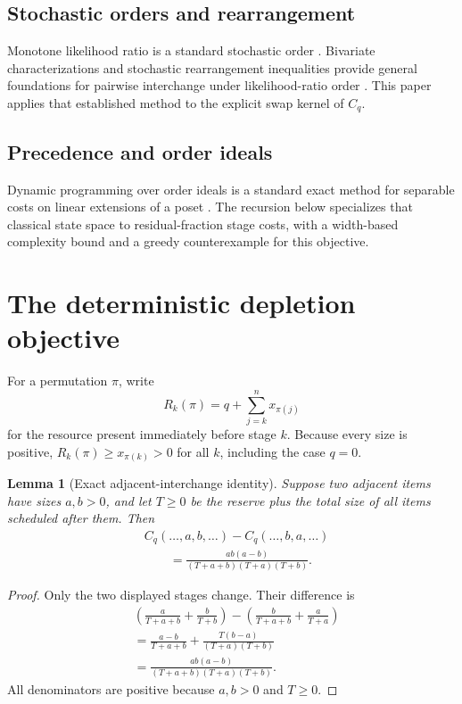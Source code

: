 \documentclass[pdflatex,iicol,sn-basic]{sn-jnl}
\theoremstyle{thmstyleone}
\newtheorem{lemma}[theorem]{Lemma}
\theoremstyle{thmstyletwo}
\theoremstyle{thmstylethree}
\begin{document}
\subsection{Stochastic orders and rearrangement}
Monotone likelihood ratio is a standard stochastic order
\citep{KarlinRubin1956,ShakedShanthikumar2007}. Bivariate characterizations and
stochastic rearrangement inequalities provide general foundations for pairwise
interchange under likelihood-ratio order
\citep{ShanthikumarYao1991,ChangYao1993}. This paper applies that established
method to the explicit swap kernel of \(C_q\).

\subsection{Precedence and order ideals}
Dynamic programming over order ideals is a standard exact method for separable
costs on linear extensions of a poset \citep{Steiner1984}. The recursion below
specializes that classical state space to residual-fraction stage costs, with a
width-based complexity bound and a greedy counterexample for this objective.

\section{The deterministic depletion objective}
\label{sec:deterministic}

For a permutation \(\pi\), write
\[
R_k(\pi)=q+\sum_{j=k}^{n}x_{\pi(j)}
\]
for the resource present immediately before stage \(k\). Because every size is
positive, \(R_k(\pi)\ge x_{\pi(k)}>0\) for all \(k\), including the case
\(q=0\).

\begin{lemma}[Exact adjacent-interchange identity]
\label{lem:swap}
Suppose two adjacent items have sizes \(a,b>0\), and let \(T\ge 0\) be the
reserve plus the total size of all items scheduled after them. Then
\begin{align}
&C_q(\ldots,a,b,\ldots)-C_q(\ldots,b,a,\ldots)\nonumber\\
&\qquad=
\frac{ab(a-b)}{(T+a+b)(T+a)(T+b)}.
\label{eq:swap}
\end{align}
\end{lemma}

\begin{proof}
Only the two displayed stages change. Their difference is
\begin{align*}
&\left(\frac{a}{T+a+b}+\frac{b}{T+b}\right)
-
\left(\frac{b}{T+a+b}+\frac{a}{T+a}\right)\\
&=\frac{a-b}{T+a+b}
+\frac{T(b-a)}{(T+a)(T+b)}\\
&=\frac{ab(a-b)}{(T+a+b)(T+a)(T+b)}.
\end{align*}
All denominators are positive because \(a,b>0\) and \(T\ge 0\).
\end{proof}
\end{document}
